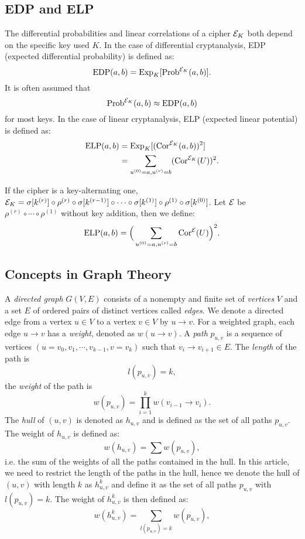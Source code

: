 \subsection{EDP and ELP \cite{DR02}}
The differential probabilities and linear correlations of a cipher $\mathcal{E}_K$ both depend on the specific key used $K$. In the case of differential cryptanalysis, EDP (expected differential probability) is defined as:
\[
    \text{EDP}(a,b)=\text{Exp}_{K}[\text{Prob}^{\mathcal{E}_K}(a,b)].
\]
It is often assumed that
\[
    \text{Prob}^{\mathcal{E}_K}(a,b)\approx\text{EDP}(a,b)
\]
for most keys. In the case of linear cryptanalysis, ELP (expected linear potential) is defined as:
\begin{align*}
    \text{ELP}(a,b)&=\text{Exp}_{K}[(\text{Cor}^{\mathcal{E}_K}(a,b))^2]\\
    &=\sum\limits_{u^{(0)}=a,u^{(r)}=b}(\text{Cor}^{\mathcal{E}_K}(U))^2.
\end{align*}
    

If the cipher is a key-alternating one, $\mathcal{E}_K=\sigma[k^{(r)}]\circ\rho^{(r)}\circ\sigma[k^{(r-1)}]\circ\cdots\circ\sigma[k^{(1)}]\circ\rho^{(1)}\circ\sigma[k^{(0)}]$. Let $\mathcal{E}$ be $\rho^{(r)}\circ\cdots\circ\rho^{(1)}$ without key addition, then we define:
\[
    \text{ELP}(a,b)=\Big(\sum\limits_{u^{(0)}=a,u^{(r)}=b}\text{Cor}^{\mathcal{E}}(U)\Big)^2.
\]


\subsection{Concepts in Graph Theory}

A \textit{directed graph} $G(V, E)$ consists of a nonempty and finite set of \textit{vertices} $V$ and a set $E$ of ordered pairs of distinct vertices called \textit{edges}. We denote a directed edge from a vertex $u\in V$ to a vertex $v\in V$ by $u\rightarrow v$. For a weighted graph, each edge $u\rightarrow v$ has a \textit{weight}, denoted as $w(u\rightarrow v)$. A \textit{path} $p_{u,v}$ is a sequence of vertices $(u=v_0,v_1,\cdots,v_{k-1},v=v_k)$ such that $v_i\rightarrow v_{i+1}\in E$. The \textit{length} of the path is
\[
    l(p_{u,v})=k,
\]
the \textit{weight} of the path is
\[
    w(p_{u,v})=\prod\limits_{i=1}^{k}w(v_{i-1}\rightarrow v_i).
\]
The \textit{hull} of $(u,v)$ is denoted as $h_{u,v}$ and is defined as the set of all paths $p_{u,v}$. The weight of $h_{u,v}$ is defined as:
\[
    w(h_{u,v})=\sum w(p_{u,v}),
\]
i.e. the sum of the weights of all the paths contained in the hull. In this article, we need to restrict the length of the paths in the hull, hence we denote the hull of $(u,v)$ with length $k$ as $h_{u,v}^k$ and define it as the set of all paths $p_{u,v}$ with $l(p_{u,v})=k$. The weight of $h_{u,v}^k$ is then defined as:
\[
    w(h_{u,v}^k)=\sum\limits_{l(p_{u,v})=k} w(p_{u,v}),
\]

